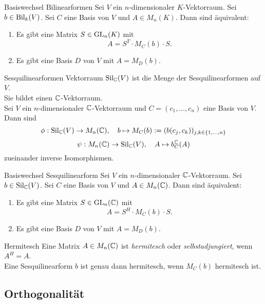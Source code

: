\documentclass[main.tex]{subfiles}
\begin{document}
\begin{karte}{Basiswechsel Bilinearformen}
    Sei \(V\) ein \(n\)-dimensionaler \(K\)-Vektorraum. 
    Sei \( b\in \operatorname{Bil}_k(V) \). Sei \(C\) eine Basis 
    von \(V\) und \(A\in M_n(K)\). Dann sind 
    äquivalent:
    \begin{enumerate}
        \item Es gibt eine Matrix \(S\in \operatorname{GL}_n(K)\) mit 
        \[ A=S^T \cdot M_C(b) \cdot S. \]
        \item Es gibt eine Basis \( D \) von \(V\) mit
        \(A=M_D(b)\).
    \end{enumerate}
\end{karte}

\begin{karte}{Sesquilinearformen Vektorraum}
    \( \operatorname{Sil}_{\mathbb{C}}(V) \) ist die Menge der 
    Sesquilinearformen auf \( V \). \\
    Sie bildet einen \( \mathbb{C} \)-Vektorraum.\\
    Sei \( V \) ein \(n\)-dimensionaler \(\mathbb{C}\)-Vektorraum 
    und \( C=(c_1, \ldots, c_n) \) eine Basis von \(V\).
    Dann sind  
    \[ \phi : \operatorname{Sil}_{\mathbb{C}}(V) \rightarrow M_n(\mathbb{C}), \quad
    b\mapsto M_C(b) := (b(c_j, c_k))_{j,k\in\{1,\ldots,n\}} \]
    \[ \psi : M_n(\mathbb{C}) \rightarrow \operatorname{Sil}_{\mathbb{C}}(V),\quad A \mapsto b^{\mathbb{C}}_C(A) \]
    zueinander inverse Isomorphismen.
\end{karte}

\begin{karte}{Basiswechsel Sesquilinearform}
    Sei \(V\) ein \(n\)-dimensionaler \(\mathbb{C}\)-Vektorraum. 
    Sei \(b \in \operatorname{Sil}_{\mathbb{C}}(V)\). Sei \(C\) eine Basis von 
    \(V\) und \(A\in M_n(\mathbb{C})\). Dann sind äquivalent:
    \begin{enumerate}
        \item Es gibt eine Matrix \( S \in \operatorname{GL}_n(\mathbb{C}) \) mit 
        \[ A=S^H \cdot M_C(b) \cdot S. \]
        \item Es gibt eine Basis \(D\) von \( V \) 
        mit \( A=M_D(b) \).
    \end{enumerate}
\end{karte}

\begin{karte}{Hermitesch}
    Eine Matrix \(A\in M_n(\mathbb{C})\) ist \textit{hermitesch} 
    oder \textit{selbstadjungiert}, wenn \(A^H=A\).\\
    Eine Sesquilinearform \( b \) ist genau dann 
    hermitesch, wenn \(M_C(b)\) hermitesch ist.
\end{karte}

\subsection*{Orthogonalität}
\end{document}
